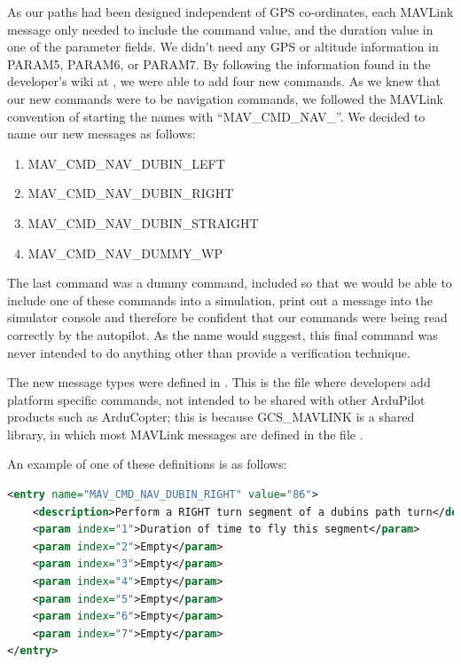  As our paths had been designed independent of GPS co-ordinates, each MAVLink message only needed to include the command value, and the duration value in one of the parameter fields. We didn't need any GPS or altitude information in PARAM5, PARAM6, or PARAM7. By following the information found in the developer's wiki at \cite{ArduPilotMAVLink}, we were able to add four new commands. As we knew that our new commands were to be navigation commands, we followed the MAVLink convention of starting the names with ``MAV\_CMD\_NAV\_''. We decided to name our new messages as follows:

 \begin{enumerate}
 	\item MAV\_CMD\_NAV\_DUBIN\_LEFT
 	\item MAV\_CMD\_NAV\_DUBIN\_RIGHT
 	\item MAV\_CMD\_NAV\_DUBIN\_STRAIGHT
 	\item MAV\_CMD\_NAV\_DUMMY\_WP
 \end{enumerate}

 The last command was a dummy command, included so that we would be able to include one of these commands into a simulation, print out a message into the simulator console and therefore be confident that our commands were being read correctly by the autopilot. As the name would suggest, this final command was never intended to do anything other than provide a verification technique.

 The new message types were defined in . This is the file where developers add platform specific commands, not intended to be shared with other ArduPilot products such as ArduCopter; this is because GCS\_MAVLINK is a shared library, in which most MAVLink messages are defined in the file .

 An example of one of these definitions is as follows:

 \begin{minipage}{\linewidth}
\begin{lstlisting}[language=XML]
<entry name="MAV_CMD_NAV_DUBIN_RIGHT" value="86">
	<description>Perform a RIGHT turn segment of a dubins path turn</description>
	<param index="1">Duration of time to fly this segment</param>
	<param index="2">Empty</param>
	<param index="3">Empty</param>
	<param index="4">Empty</param>
	<param index="5">Empty</param>
	<param index="6">Empty</param>
	<param index="7">Empty</param>
</entry>
\end{lstlisting}
\end{minipage}


